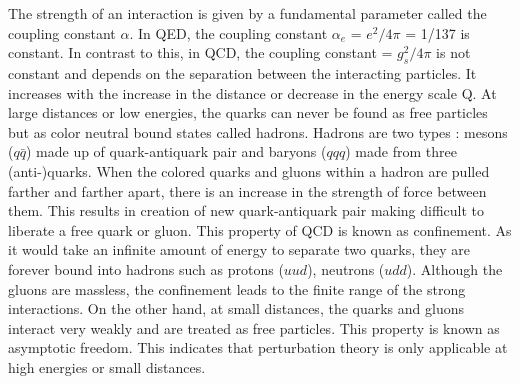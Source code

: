 The strength of an interaction is given by a fundamental parameter called the coupling constant $\alpha$. In QED, the coupling constant $\alpha_e$ = $e^2/4\pi$ = 1/137 is constant. In contrast to this, in QCD, the coupling constant \alpsq = $g^2_s/4\pi$ is not constant and depends on the separation between the interacting particles. It increases with the increase in the distance or decrease in the energy scale Q. At large distances or low energies, the quarks can never be found as free particles but as color neutral bound states called hadrons. Hadrons are two types : mesons ($q\bar{q}$) made up of quark-antiquark pair and baryons ($qqq$) made from three (anti-)quarks. When the colored quarks and gluons within a hadron are pulled farther and farther apart, there is an increase in the strength of force between them. This results in creation of new quark-antiquark pair making difficult to liberate a free quark or gluon. This property of QCD is known as confinement. As it would take an infinite amount of energy to separate two quarks, they are forever bound into hadrons such as protons ($uud$), neutrons ($udd$). Although the gluons are massless, the confinement leads to the finite range of the strong interactions. On the other hand, at small distances, the quarks and gluons interact very weakly and are treated as free particles. This property is known as asymptotic freedom. This indicates that perturbation theory is only applicable at high energies or small distances.

